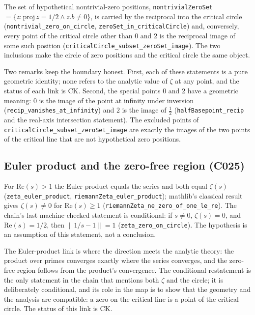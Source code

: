 \documentclass[sigplan,10pt,anonymous,review]{acmart}
\begin{document}
The set of hypothetical nontrivial-zero positions,
\texttt{nontrivialZeroSet} $= \{z : \mathrm{proj}\, z = 1/2 \wedge z.b
\ne 0\}$, is carried by the reciprocal into the critical circle
(\texttt{nontrivial\_zero\_on\_circle},
\texttt{zeroSet\_in\_criticalCircle}) and, conversely, every point of the
critical circle other than $0$ and $2$ is the reciprocal image of some
such position (\texttt{criticalCircle\_subset\_zeroSet\_image}). The two
inclusions make the circle of zero positions and the critical circle the
same object.

Two remarks keep the boundary honest. First, each of these statements is
a pure geometric identity; none refers to the analytic value of $\zeta$
at any point, and the status of each link is
\textcolor{classical}{CK}. Second, the special points $0$ and $2$ have a
geometric meaning: $0$ is the image of the point at infinity under
inversion (\texttt{recip\_vanishes\_at\_infinity}) and $2$ is the image
of $\frac12$ (\texttt{halfBasepoint\_recip} and the real-axis
intersection statement). The excluded points of
\texttt{criticalCircle\_subset\_zeroSet\_image} are exactly the images
of the two points of the critical line that are not hypothetical zero
positions.

\subsection{Euler product and the zero-free region (C025)}

For $\mathrm{Re}(s) > 1$ the Euler product equals the series and both
equal $\zeta(s)$ (\texttt{zeta\_euler\_product},
\texttt{riemannZeta\_euler\_product}); mathlib's classical result gives
$\zeta(s) \ne 0$ for $\mathrm{Re}(s) \ge 1$
(\texttt{riemannZeta\_ne\_zero\_of\_one\_le\_re}). The chain's last
machine-checked statement is conditional: if $s \ne 0$, $\zeta(s) = 0$,
and $\mathrm{Re}(s) = 1/2$, then $\|1/s - 1\| = 1$
(\texttt{zeta\_zero\_on\_circle}). The hypothesis is an assumption of
this statement, not a conclusion.

The Euler-product link is where the direction meets the analytic theory:
the product over primes converges exactly where the series converges, and
the zero-free region follows from the product's convergence. The
conditional restatement is the only statement in the chain that mentions
both $\zeta$ and the circle; it is deliberately conditional, and its role
in the map is to show that the geometry and the analysis are compatible:
a zero on the critical line is a point of the critical circle. The status
of this link is \textcolor{classical}{CK}.
\end{document}
